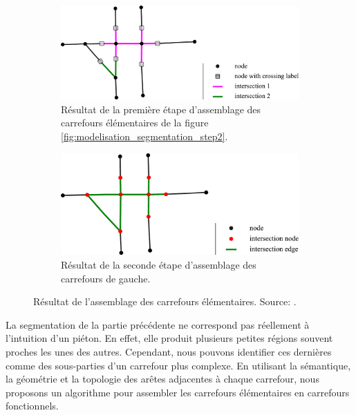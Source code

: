 \begin{figure}
    \centering
    \begin{subfigure}[t]{.49\linewidth}
        \includegraphics[width=\textwidth]{images/modelisation/segmentation/segmentation-step3.pdf}
        \caption{Résultat de la première étape d'assemblage des carrefours élémentaires de la figure \ref{fig:modelisation_segmentation_step2}.\label{fig:modelisation_segmentation_step3}}
    \end{subfigure}
    \begin{subfigure}[t]{.49\linewidth}
        \includegraphics[width=\textwidth]{images/modelisation/segmentation/segmentation-step4.pdf}
        \caption{Résultat de la seconde étape d'assemblage des carrefours de gauche.\label{fig:modelisation_segmentation_step4}}
    \end{subfigure}
    \caption{Résultat de l'assemblage des carrefours élémentaires. Source: \cite{Favreau2022}.}
    \label{fig:modelisation_segmentation_step3&4}
\end{figure}

La segmentation de la partie précédente ne correspond pas réellement à l'intuition d'un piéton. En effet, elle produit plusieurs petites régions souvent proches les unes des autres. Cependant, nous pouvons identifier ces dernières comme des sous-parties d'un carrefour plus complexe. En utilisant la sémantique, la géométrie et la topologie des arêtes adjacentes à chaque carrefour, nous proposons un algorithme pour assembler les carrefours élémentaires en carrefours fonctionnels.

